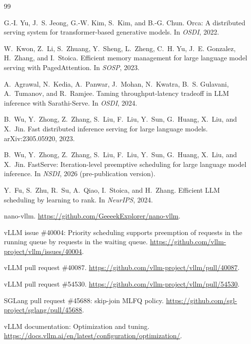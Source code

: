 \documentclass[11pt]{article}
\begin{document}
\begin{thebibliography}{99}
\small

G.-I. Yu, J.~S. Jeong, G.-W. Kim, S.~Kim, and B.-G. Chun.
\newblock Orca: A distributed serving system for transformer-based generative models.
\newblock In \emph{OSDI}, 2022.

W.~Kwon, Z.~Li, S.~Zhuang, Y.~Sheng, L.~Zheng, C.~H. Yu, J.~E. Gonzalez, H.~Zhang, and I.~Stoica.
\newblock Efficient memory management for large language model serving with PagedAttention.
\newblock In \emph{SOSP}, 2023.

A.~Agrawal, N.~Kedia, A.~Panwar, J.~Mohan, N.~Kwatra, B.~S. Gulavani, A.~Tumanov, and R.~Ramjee.
\newblock Taming throughput-latency tradeoff in LLM inference with Sarathi-Serve.
\newblock In \emph{OSDI}, 2024.

B.~Wu, Y.~Zhong, Z.~Zhang, S.~Liu, F.~Liu, Y.~Sun, G.~Huang, X.~Liu, and X.~Jin.
\newblock Fast distributed inference serving for large language models.
\newblock arXiv:2305.05920, 2023.

B.~Wu, Y.~Zhong, Z.~Zhang, S.~Liu, F.~Liu, Y.~Sun, G.~Huang, X.~Liu, and X.~Jin.
\newblock FastServe: Iteration-level preemptive scheduling for large language model inference.
\newblock In \emph{NSDI}, 2026 (pre-publication version).

Y.~Fu, S.~Zhu, R.~Su, A.~Qiao, I.~Stoica, and H.~Zhang.
\newblock Efficient LLM scheduling by learning to rank.
\newblock In \emph{NeurIPS}, 2024.

nano-vllm. \url{https://github.com/GeeeekExplorer/nano-vllm}.

vLLM issue \#40004: Priority scheduling supports preemption of requests in the running queue by
requests in the waiting queue. \url{https://github.com/vllm-project/vllm/issues/40004}.

vLLM pull request \#40087. \url{https://github.com/vllm-project/vllm/pull/40087}.

vLLM pull request \#54530. \url{https://github.com/vllm-project/vllm/pull/54530}.

SGLang pull request \#45688: skip-join MLFQ policy.
\url{https://github.com/sgl-project/sglang/pull/45688}.

vLLM documentation: Optimization and tuning.
\url{https://docs.vllm.ai/en/latest/configuration/optimization/}.

\end{thebibliography}
\end{document}
